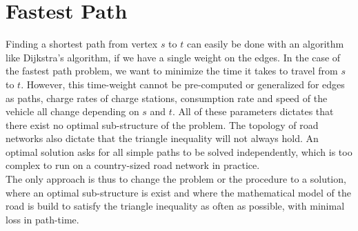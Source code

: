 \section{Fastest Path}
Finding a shortest path from vertex $s$ to $t$ can easily be done with an algorithm like Dijkstra's algorithm, if we have a single weight on the edges. In the case of the fastest path problem, we want to minimize the time it takes to travel from $s$ to $t$. However, this time-weight cannot be pre-computed or generalized for edges as paths, charge rates of charge stations, consumption rate and speed of the vehicle all change depending on $s$ and $t$. All of these parameters dictates that there exist no optimal sub-structure of the problem. The topology of road networks also dictate that the triangle inequality will not always hold. An optimal solution asks for all simple paths to be solved independently, which is too complex to run on a country-sized road network in practice.\\

The only approach is thus to change the problem or the procedure to a solution, where an optimal sub-structure is exist and where the mathematical model of the road is build to satisfy the triangle inequality as often as possible, with minimal loss in path-time.\\
